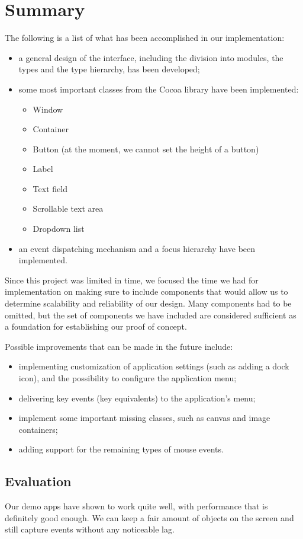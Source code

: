 \documentclass[a4paper]{article}
\begin{document}
\section{Summary}
The following is a list of what has been accomplished in our implementation:
\begin{itemize}
\item a general design of the interface, including the division into modules, the types and the type hierarchy, has been developed;
\item some most important classes from the Cocoa library have been implemented:
\begin{itemize}
\item Window
\item Container
\item Button (at the moment, we cannot set the height of a button)
\item Label
\item Text field
\item Scrollable text area
\item Dropdown list
\end{itemize}
\item an event dispatching mechanism and a focus hierarchy have been implemented.
\end{itemize}

Since this project was limited in time, we focused the time we had for implementation on making sure to include components that would allow us to determine scalability and reliability of our design. Many components had to be omitted, but the set of components we have included are considered sufficient as a foundation for establishing our proof of concept.

Possible improvements that can be made in the future include:
\begin{itemize}
\item implementing customization of application settings (such as adding a dock icon), and the possibility to configure the application menu;
\item delivering key events (key equivalents) to the application's menu;
\item implement some important missing classes, such as canvas and image containers;
\item adding support for the remaining types of mouse events.
\end{itemize}

\subsection{Evaluation}
Our demo apps have shown to work quite well, with performance that is definitely good enough. We can keep a fair amount of objects on the screen and still capture events without any noticeable lag.
\end{document}
